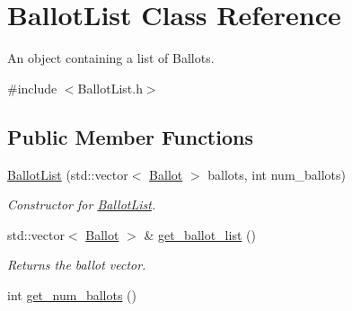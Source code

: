 \hypertarget{class_ballot_list}{}\section{Ballot\+List Class Reference}
\label{class_ballot_list}


An object containing a list of Ballots.  




{\ttfamily \#include $<$Ballot\+List.\+h$>$}

\subsection*{Public Member Functions}
\begin{DoxyCompactItemize}
\item 
\hyperlink{class_ballot_list_a0a28d688e8a0cd744f6d75080b4b0c3c}{Ballot\+List} (std\+::vector$<$ \hyperlink{class_ballot}{Ballot} $>$ ballots, int num\+\_\+ballots)
\begin{DoxyCompactList}\small\item\em Constructor for \hyperlink{class_ballot_list}{Ballot\+List}. \end{DoxyCompactList}\item 
std\+::vector$<$ \hyperlink{class_ballot}{Ballot} $>$ \& \hyperlink{class_ballot_list_aab8721f12320262c4a314df4194f4fcf}{get\+\_\+ballot\+\_\+list} ()\hypertarget{class_ballot_list_aab8721f12320262c4a314df4194f4fcf}{}\label{class_ballot_list_aab8721f12320262c4a314df4194f4fcf}

\begin{DoxyCompactList}\small\item\em Returns the ballot vector. \end{DoxyCompactList}\item 
int \hyperlink{class_ballot_list_a8cc1453cabd26e0cf497fa5a943c8728}{get\+\_\+num\+\_\+ballots} ()\hypertarget{class_ballot_list_a8cc1453cabd26e0cf497fa5a943c8728}{}\label{class_ballot_list_a8cc1453cabd26e0cf497fa5a943c8728}


\end{DoxyCompactItemize}
